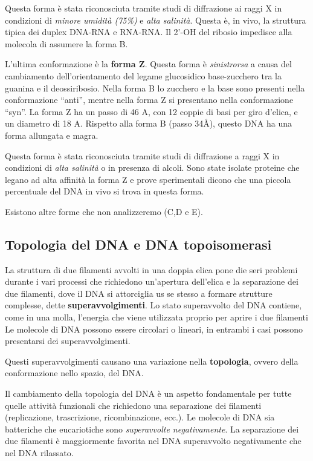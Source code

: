 \documentclass[11pt]{book}
\begin{document}
Questa forma è stata riconosciuta tramite studi di diffrazione ai raggi
X in condizioni di \emph{minore umidità (75\%)} e \emph{alta salinità}.
Questa è, in vivo, la struttura tipica dei duplex DNA-RNA e RNA-RNA. Il
2'-OH del ribosio impedisce alla molecola di assumere la forma B.

L'ultima conformazione è la \textbf{forma Z}. Questa forma è
\emph{sinistrorsa} a causa del cambiamento dell'orientamento del legame
glucosidico base-zucchero tra la guanina e il deossiribosio. Nella forma
B lo zucchero e la base sono presenti nella conformazione ``anti'',
mentre nella forma Z si presentano nella conformazione ``syn''. La forma
Z ha un passo di 46 A, con 12 coppie di basi per giro d'elica, e un
diametro di 18 A. Rispetto alla forma B (passo 34Å), questo DNA ha una
forma allungata e magra.

Questa forma è stata riconosciuta tramite studi di diffrazione a raggi X
in condizioni di \emph{alta salinità} o in presenza di alcoli. Sono
state isolate proteine che legano ad alta affinità la forma Z e prove
sperimentali dicono che una piccola percentuale del DNA in vivo si trova
in questa forma.

Esistono altre forme che non analizzeremo (C,D e E).

\subsection{Topologia del DNA e DNA
topoisomerasi}\label{topologia-del-dna-e-dna-topoisomerasi}

La struttura di due filamenti avvolti in una doppia elica pone die seri
problemi durante i vari processi che richiedono un'apertura dell'elica e
la separazione dei due filamenti, dove il DNA si attorciglia us se
stesso a formare strutture complesse, dette \textbf{superavvolgimenti}.
Lo stato superavvolto del DNA contiene, come in una molla, l'energia che
viene utilizzata proprio per aprire i due filamenti Le molecole di DNA
possono essere circolari o lineari, in entrambi i casi possono
presentarsi dei superavvolgimenti.

Questi superavvolgimenti causano una variazione nella
\textbf{topologia}, ovvero della conformazione nello spazio, del DNA.

Il cambiamento della topologia del DNA è un aspetto fondamentale per
tutte quelle attività funzionali che richiedono una separazione dei
filamenti (replicazione, trascrizione, ricombinazione, ecc.). Le
molecole di DNA sia batteriche che eucariotiche sono \emph{superavvolte
negativamente}. La separazione dei due filamenti è maggiormente favorita
nel DNA superavvolto negativamente che nel DNA rilassato.
\end{document}
